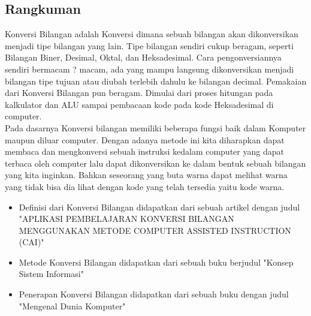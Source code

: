 \subsection{Rangkuman}
Konversi Bilangan adalah Konversi dimana sebuah bilangan akan dikonversikan menjadi tipe bilangan yang lain. Tipe bilangan sendiri cukup beragam, seperti Bilangan Biner, Desimal, Oktal, dan Heksadesimal. Cara pengonversiannya sendiri bermacam ? macam, ada yang mampu langsung dikonversikan menjadi bilangan tipe tujuan atau diubah terlebih dahulu ke bilangan decimal. Pemakaian dari Konversi Bilangan pun beragam. Dimulai dari proses hitungan pada kalkulator dan ALU sampai pembacaan kode pada kode Heksadesimal di computer. 
\\Pada dasarnya Konversi bilangan memiliki beberapa fungsi baik dalam Komputer maupun diluar computer. Dengan adanya metode ini kita diharapkan dapat membaca dan mengkonversi sebuah instruksi kedalam computer yang dapat terbaca oleh computer lalu dapat dikonversikan ke dalam bentuk sebuah bilangan yang kita inginkan. Bahkan seseorang yang buta warna dapat melihat warna yang tidak bisa dia lihat dengan kode yang telah tersedia yaitu kode warna. 
\break
\break
\break
\begin{itemize}
\item Definisi dari Konversi Bilangan didapatkan dari sebuah artikel dengan judul "APLIKASI PEMBELAJARAN KONVERSI BILANGAN MENGGUNAKAN METODE COMPUTER ASSISTED INSTRUCTION (CAI)" \cite{gulo2016aplikasi}
\item Metode Konversi Bilangan didapatkan dari sebuah buku berjudul "Konsep Sistem Informasi" \cite{hutahaean2015konsep}
\item Penerapan Konversi Bilangan didapatkan dari sebuah buku dengan judul "Mengenal Dunia Komputer" \cite{noersasongko1996mengrnal}
\end{itemize}
